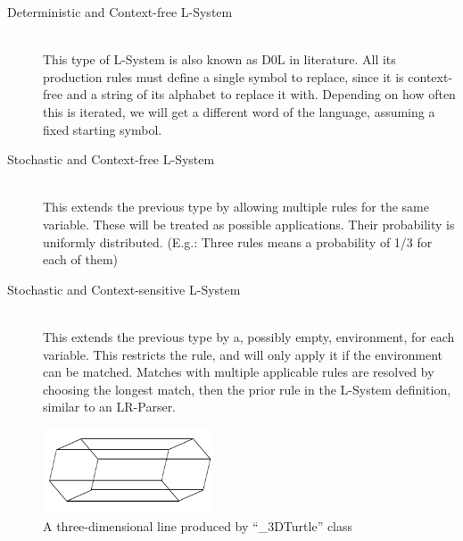 \documentclass[11pt,a4paper]{article}
\begin{document}
\begin{description}

\item[Deterministic and Context-free L-System]\hfill \\
This type of L-System is also known as D0L in literature. All its production rules must define a single symbol to replace, since it is  context-free and a string of its alphabet to replace it with. Depending on how often this is iterated, we will get a different word of the language, assuming a fixed starting symbol. 
\item[Stochastic and Context-free L-System]\hfill \\
This extends the previous type by allowing multiple rules for the same variable. These will be treated as possible applications. Their probability is uniformly distributed. (E.g.: Three rules means a probability of 1/3 for each of them)
\item[Stochastic and Context-sensitive L-System]\hfill \\
This extends the previous type by a, possibly empty, environment, for each variable. This restricts the rule, and will only apply it if the environment can be matched. Matches with multiple applicable rules are resolved by choosing the longest match, then the prior rule in the L-System definition, similar to an LR-Parser.
\end{description}


\begin{figure}
  \begin{center}
    \includegraphics[width=0.45\textwidth]{images/line}
  \end{center} 
  \caption{A three-dimensional line produced by ``\_3DTurtle'' class}
  \label{fig:line}
\end{figure}
\end{document}
